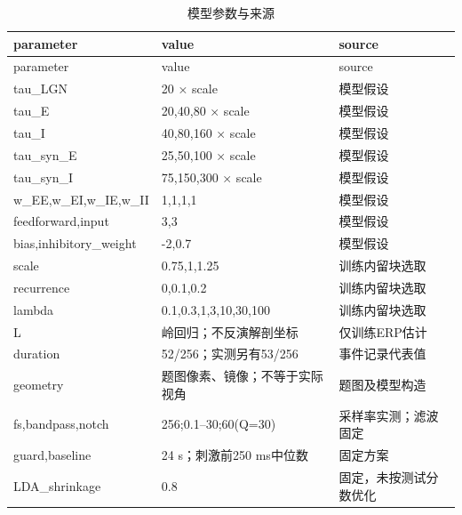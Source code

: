 \documentclass[UTF8,a4paper,11pt]{ctexart}
\begin{document}
\small\begin{longtable}{p{.26\linewidth}p{.43\linewidth}p{.22\linewidth}}

\caption{模型参数与来源}\\\toprule

parameter & value & source\\\midrule\endfirsthead

parameter & value & source\\\midrule\endhead

tau\_LGN & 20 × scale & 模型假设\\

tau\_E & 20,40,80 × scale & 模型假设\\

tau\_I & 40,80,160 × scale & 模型假设\\

tau\_syn\_E & 25,50,100 × scale & 模型假设\\

tau\_syn\_I & 75,150,300 × scale & 模型假设\\

w\_EE,w\_EI,w\_IE,w\_II & 1,1,1,1 & 模型假设\\

feedforward,input & 3,3 & 模型假设\\

bias,inhibitory\_weight & -2,0.7 & 模型假设\\

scale & 0.75,1,1.25 & 训练内留块选取\\

recurrence & 0,0.1,0.2 & 训练内留块选取\\

lambda & 0.1,0.3,1,3,10,30,100 & 训练内留块选取\\

L & 岭回归；不反演解剖坐标 & 仅训练ERP估计\\

duration & 52/256；实测另有53/256 & 事件记录代表值\\

geometry & 题图像素、镜像；不等于实际视角 & 题图及模型构造\\

fs,bandpass,notch & 256;0.1–30;60(Q=30) & 采样率实测；滤波固定\\

guard,baseline & 24 s；刺激前250 ms中位数 & 固定方案\\

LDA\_shrinkage & 0.8 & 固定，未按测试分数优化\\

\bottomrule\end{longtable}\normalsize
\end{document}

